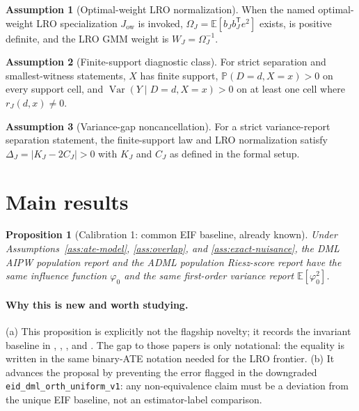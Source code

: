 \documentclass[11pt]{article}
\newcommand{\E}{\mathbb{E}}
\renewcommand{\Pr}{\mathbb{P}}
\newcommand{\transpose}{\mathsf{T}}
\theoremstyle{definition}
\newtheorem{assumption}{Assumption}
\theoremstyle{plain}
\newtheorem{proposition}{Proposition}
\theoremstyle{remark}
\begin{document}
\begin{assumption}[Optimal-weight LRO normalization]\label{ass:optimal-lro}
When the named optimal-weight LRO specialization $J_{\mathrm{ow}}$ is invoked, $\Omega_J=\E[b_Jb_J^\transpose e^2]$ exists, is positive definite, and the LRO GMM weight is $W_J=\Omega_J^{-1}$.
\end{assumption}

\begin{assumption}[Finite-support diagnostic class]\label{ass:finite-support}
For strict separation and smallest-witness statements, $X$ has finite support, $\Pr(D=d,X=x)>0$ on every support cell, and $\operatorname{Var}(Y\mid D=d,X=x)>0$ on at least one cell where $r_J(d,x)\ne0$.
\end{assumption}

\begin{assumption}[Variance-gap noncancellation]\label{ass:noncancel}
For a strict variance-report separation statement, the finite-support law and LRO normalization satisfy $\Delta_J=|K_J-2C_J|>0$ with $K_J$ and $C_J$ as defined in the formal setup.
\end{assumption}

\section{Main results}
\begin{proposition}[Calibration 1: common EIF baseline, already known]\label{prop:common-eif}
Under Assumptions~\ref{ass:ate-model}, \ref{ass:overlap}, and \ref{ass:exact-nuisance}, the DML AIPW population report and the ADML population Riesz-score report have the same influence function $\varphi_0$ and the same first-order variance report $\E[\varphi_0^2]$.
\end{proposition}
\paragraph{Why this is new and worth studying.}
(a) This proposition is explicitly not the flagship novelty; it records the invariant baseline in \citet{Hahn1998Econometrica}, \citet{HiranoImbensRidder2003Econometrica}, \citet{ChernozhukovEtAl2018ECTJ}, and \citet{ChernozhukovNeweySingh2022ADML}.  The gap to those papers is only notational: the equality is written in the same binary-ATE notation needed for the LRO frontier.  (b) It advances the proposal by preventing the error flagged in the downgraded \texttt{eid\_dml\_orth\_uniform\_v1}: any non-equivalence claim must be a deviation from the unique EIF baseline, not an estimator-label comparison.
\end{document}
